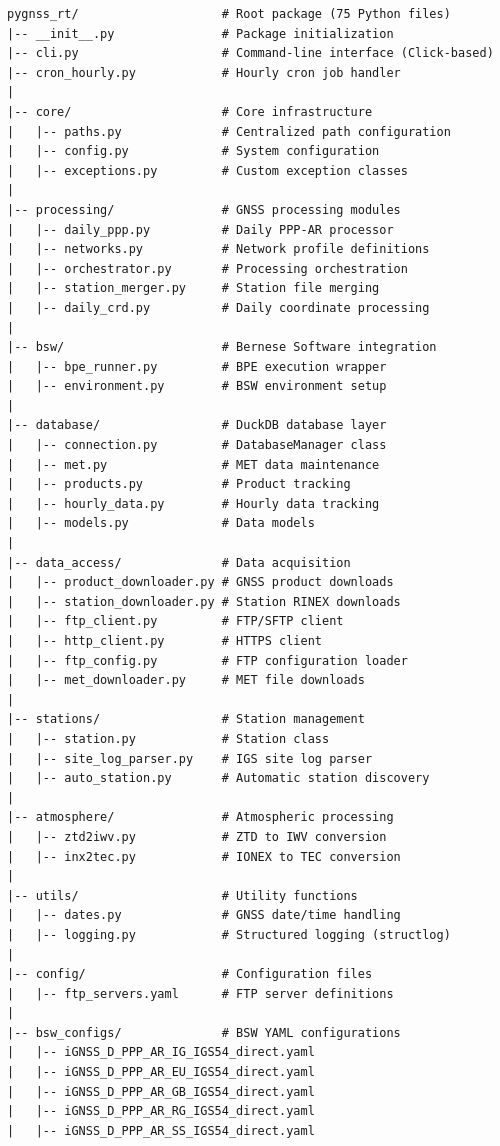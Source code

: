\documentclass[11pt,a4paper,twoside]{report}
\begin{document}
\begin{lstlisting}[style=bashstyle, caption={Complete Directory Structure}, label={lst:dirtree}]
pygnss_rt/                    # Root package (75 Python files)
|-- __init__.py               # Package initialization
|-- cli.py                    # Command-line interface (Click-based)
|-- cron_hourly.py            # Hourly cron job handler
|
|-- core/                     # Core infrastructure
|   |-- paths.py              # Centralized path configuration
|   |-- config.py             # System configuration
|   |-- exceptions.py         # Custom exception classes
|
|-- processing/               # GNSS processing modules
|   |-- daily_ppp.py          # Daily PPP-AR processor
|   |-- networks.py           # Network profile definitions
|   |-- orchestrator.py       # Processing orchestration
|   |-- station_merger.py     # Station file merging
|   |-- daily_crd.py          # Daily coordinate processing
|
|-- bsw/                      # Bernese Software integration
|   |-- bpe_runner.py         # BPE execution wrapper
|   |-- environment.py        # BSW environment setup
|
|-- database/                 # DuckDB database layer
|   |-- connection.py         # DatabaseManager class
|   |-- met.py                # MET data maintenance
|   |-- products.py           # Product tracking
|   |-- hourly_data.py        # Hourly data tracking
|   |-- models.py             # Data models
|
|-- data_access/              # Data acquisition
|   |-- product_downloader.py # GNSS product downloads
|   |-- station_downloader.py # Station RINEX downloads
|   |-- ftp_client.py         # FTP/SFTP client
|   |-- http_client.py        # HTTPS client
|   |-- ftp_config.py         # FTP configuration loader
|   |-- met_downloader.py     # MET file downloads
|
|-- stations/                 # Station management
|   |-- station.py            # Station class
|   |-- site_log_parser.py    # IGS site log parser
|   |-- auto_station.py       # Automatic station discovery
|
|-- atmosphere/               # Atmospheric processing
|   |-- ztd2iwv.py            # ZTD to IWV conversion
|   |-- inx2tec.py            # IONEX to TEC conversion
|
|-- utils/                    # Utility functions
|   |-- dates.py              # GNSS date/time handling
|   |-- logging.py            # Structured logging (structlog)
|
|-- config/                   # Configuration files
|   |-- ftp_servers.yaml      # FTP server definitions
|
|-- bsw_configs/              # BSW YAML configurations
|   |-- iGNSS_D_PPP_AR_IG_IGS54_direct.yaml
|   |-- iGNSS_D_PPP_AR_EU_IGS54_direct.yaml
|   |-- iGNSS_D_PPP_AR_GB_IGS54_direct.yaml
|   |-- iGNSS_D_PPP_AR_RG_IGS54_direct.yaml
|   |-- iGNSS_D_PPP_AR_SS_IGS54_direct.yaml
\end{lstlisting}
\end{document}

